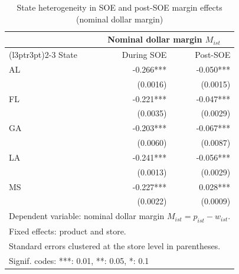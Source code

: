 \begin{table}[!h]
\centering
\caption{\label{tab:tab:margin_reg_state_heterog}State heterogeneity in SOE and post-SOE margin effects (nominal dollar margin)}
\centering
\begin{tabular}[t]{lrr}
\toprule
\multicolumn{1}{c}{ } & \multicolumn{2}{c}{Nominal dollar margin $M_{ist}$} \\
\cmidrule(l{3pt}r{3pt}){2-3}
State & During SOE & Post-SOE\\
\midrule
AL & -0.266*** & -0.050***\\
 & (0.0016) & (0.0015)\\
FL & -0.221*** & -0.047***\\
 & (0.0035) & (0.0029)\\
GA & -0.203*** & -0.067***\\
\addlinespace
 & (0.0060) & (0.0087)\\
LA & -0.241*** & -0.056***\\
 & (0.0013) & (0.0029)\\
MS & -0.227*** & 0.028***\\
 & (0.0022) & (0.0009)\\
\bottomrule
\multicolumn{3}{l}{\rule{0pt}{1em}Dependent variable: nominal dollar margin $M_{ist} = p_{ist} - w_{ist}$.}\\
\multicolumn{3}{l}{\rule{0pt}{1em}Fixed effects: product and store.}\\
\multicolumn{3}{l}{\rule{0pt}{1em}Standard errors clustered at the store level in parentheses.}\\
\multicolumn{3}{l}{\rule{0pt}{1em}Signif. codes: ***: 0.01, **: 0.05, *: 0.1}\\
\end{tabular}
\end{table}
